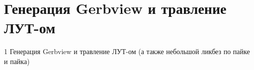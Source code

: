 \chapter{Генерация Gerbview и травление ЛУТ-ом}\label{kicad:etching}
1 Генерация Gerbview и травление ЛУТ-ом (а также небольшой ликбез по пайке и пайка)
